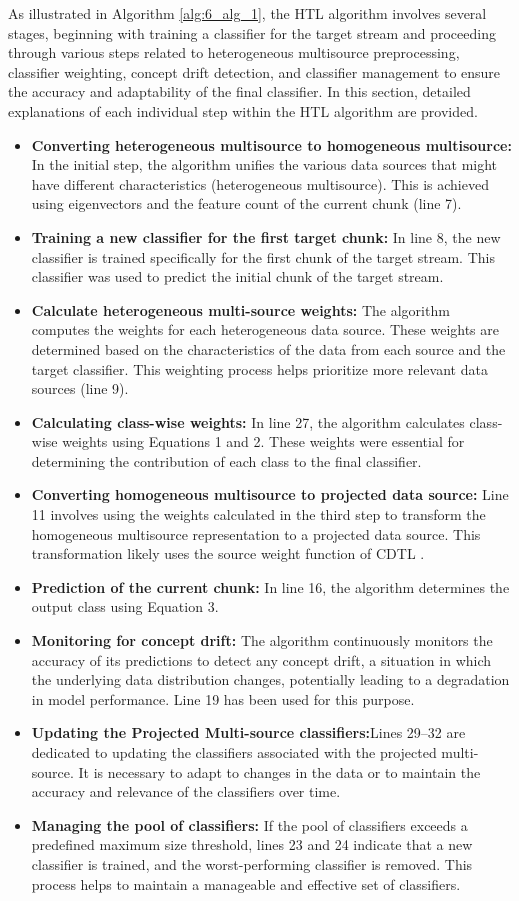 As illustrated in Algorithm \ref{alg:6_alg_1}, the HTL algorithm involves several stages, beginning with training a classifier for the target stream and proceeding through various steps related to heterogeneous multisource preprocessing, classifier weighting, concept drift detection, and classifier management to ensure the accuracy and adaptability of the final classifier. In this section, detailed explanations of each individual step within the HTL algorithm are provided.
\begin{itemize}
	\item \textbf{Converting heterogeneous multisource to homogeneous multisource:} In the initial step, the algorithm unifies the various data sources that might have different characteristics (heterogeneous multisource). This is achieved using eigenvectors and the feature count of the current chunk (line 7).
	\item \textbf{Training a new classifier for the first target chunk:} In line 8, the new classifier is trained specifically for the first chunk of the target stream. This classifier was used to predict the initial chunk of the target stream.
	\item \textbf{Calculate heterogeneous multi-source weights:} The algorithm computes the weights for each heterogeneous data source. These weights are determined based on the characteristics of the data from each source and the target classifier. This weighting process helps prioritize more relevant data sources (line 9).
	\item \textbf{Calculating class-wise weights:} In line 27, the algorithm calculates class-wise weights using Equations 1 and 2. These weights were essential for determining the contribution of each class to the final classifier.
	\item \textbf{Converting homogeneous multisource to projected data source:} Line 11 involves using the weights calculated in the third step to transform the homogeneous multisource representation to a projected data source. This transformation likely uses the source weight function of CDTL \cite{yang2021concept}.
	\item \textbf{Prediction of the current chunk:} In line 16, the algorithm determines the output class using Equation 3.
	\item \textbf{Monitoring for concept drift:} The algorithm continuously monitors the accuracy of its predictions to detect any concept drift, a situation in which the underlying data distribution changes, potentially leading to a degradation in model performance. Line 19 has been used for this purpose.
	\item \textbf{Updating the Projected Multi-source classifiers:}Lines 29–32 are dedicated to updating the classifiers associated with the projected multi-source. It is necessary to adapt to changes in the data or to maintain the accuracy and relevance of the classifiers over time.
	\item \textbf{Managing the pool of classifiers:} If the pool of classifiers exceeds a predefined maximum size threshold, lines 23 and 24 indicate that a new classifier is trained, and the worst-performing classifier is removed. This process helps to maintain a manageable and effective set of classifiers.
\end{itemize}
